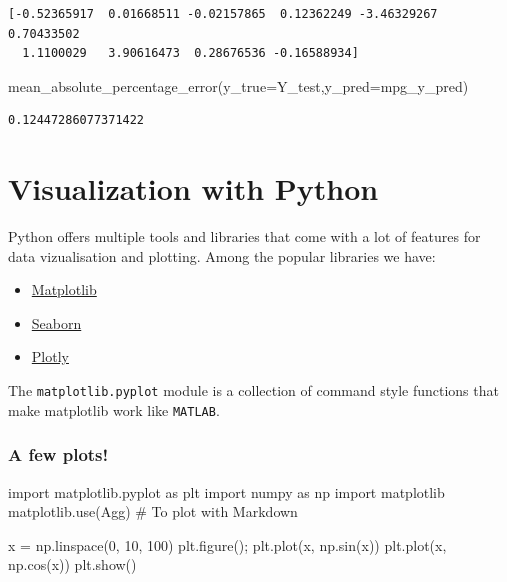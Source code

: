 \documentclass[
  letterpaper,
  DIV=11,
  numbers=noendperiod]{scrreprt}
\newenvironment{Shaded}{\begin{snugshade}}{\end{snugshade}}
\newcommand{\CommentTok}[1]{\textcolor[rgb]{0.37,0.37,0.37}{#1}}
\newcommand{\DecValTok}[1]{\textcolor[rgb]{0.68,0.00,0.00}{#1}}
\newcommand{\ImportTok}[1]{\textcolor[rgb]{0.00,0.46,0.62}{#1}}
\newcommand{\NormalTok}[1]{\textcolor[rgb]{0.00,0.23,0.31}{#1}}
\newcommand{\OperatorTok}[1]{\textcolor[rgb]{0.37,0.37,0.37}{#1}}
\newcommand{\StringTok}[1]{\textcolor[rgb]{0.13,0.47,0.30}{#1}}
\providecommand{\tightlist}{%
  \setlength{\itemsep}{0pt}\setlength{\parskip}{0pt}}\usepackage{longtable,booktabs,array}
\begin{document}
\begin{verbatim}
[-0.52365917  0.01668511 -0.02157865  0.12362249 -3.46329267  0.70433502
  1.1100029   3.90616473  0.28676536 -0.16588934]
\end{verbatim}

\begin{Shaded}
\begin{Highlighting}[]
\NormalTok{mean\_absolute\_percentage\_error(y\_true}\OperatorTok{=}\NormalTok{Y\_test,y\_pred}\OperatorTok{=}\NormalTok{mpg\_y\_pred)}
\end{Highlighting}
\end{Shaded}

\begin{verbatim}
0.12447286077371422
\end{verbatim}

\hypertarget{visualization-with-python}{%
\section*{Visualization with Python}\label{visualization-with-python}}


Python offers multiple tools and libraries that come with a lot of
features for data vizualisation and plotting. Among the popular
libraries we have:

\begin{itemize}
\tightlist
\item
  \href{https://matplotlib.org/}{Matplotlib}
\item
  \href{https://seaborn.pydata.org/}{Seaborn}
\item
  \href{https://plotly.com/python/}{Plotly}
\end{itemize}

The \texttt{matplotlib.pyplot} module is a collection of command style
functions that make matplotlib work like \texttt{MATLAB}.

\hypertarget{a-few-plots}{%
\subsubsection*{A few plots!}\label{a-few-plots}}

\begin{Shaded}
\begin{Highlighting}[]
\ImportTok{import}\NormalTok{ matplotlib.pyplot }\ImportTok{as}\NormalTok{ plt}
\ImportTok{import}\NormalTok{ numpy }\ImportTok{as}\NormalTok{ np}
\ImportTok{import}\NormalTok{ matplotlib}
\NormalTok{matplotlib.use(}\StringTok{\textquotesingle{}Agg\textquotesingle{}}\NormalTok{) }\CommentTok{\# To plot with Markdown}

\NormalTok{x }\OperatorTok{=}\NormalTok{ np.linspace(}\DecValTok{0}\NormalTok{, }\DecValTok{10}\NormalTok{, }\DecValTok{100}\NormalTok{)}
\NormalTok{plt.figure()}\OperatorTok{;}
\NormalTok{plt.plot(x, np.sin(x))}
\NormalTok{plt.plot(x, np.cos(x))}
\NormalTok{plt.show()}
\end{Highlighting}
\end{Shaded}
\end{document}
